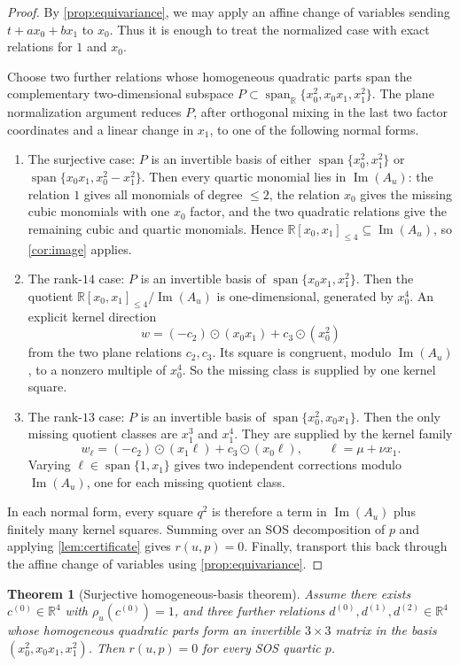 \documentclass[10pt]{article}
\newtheorem{theorem}{Theorem}[section]
\theoremstyle{definition}
\newcommand{\R}{\mathbb{R}}
\newcommand{\Poly}{\R[x_0,x_1]}
\newcommand{\Quart}{\Poly_{\le 4}}
\newcommand{\HomQ}{\operatorname{span}_{\R}\{x_0^2,x_0x_1,x_1^2\}}
\DeclareMathOperator{\mspan}{span}
\DeclareMathOperator{\imag}{Im}
\newcommand{\Span}{\mspan}
\newcommand{\im}{\imag}
\newcommand{\rel}{\rho}
\begin{document}
\begin{proof}
By \cref{prop:equivariance}, we may apply an affine change of variables sending
\(t+a x_0+b x_1\) to \(x_0\). Thus it is enough to treat the normalized case
with exact relations for \(1\) and \(x_0\).

Choose two further relations whose homogeneous quadratic parts span the
complementary two-dimensional subspace \(P\subset \HomQ\). The plane
normalization argument reduces \(P\), after orthogonal mixing in the last two
factor coordinates and a linear change in \(x_1\), to one of the following
normal forms.
\begin{enumerate}
\item The surjective case: \(P\) is an invertible basis of either
\(\Span\{x_0^2,x_1^2\}\) or \(\Span\{x_0x_1,x_0^2-x_1^2\}\). Then every quartic
monomial lies in \(\im(A_u)\): the relation \(1\) gives all monomials of degree
\(\le 2\), the relation \(x_0\) gives the missing cubic monomials with one
\(x_0\) factor, and the two quadratic relations give the remaining cubic and
quartic monomials. Hence \(\Quart\subseteq \im(A_u)\), so \cref{cor:image}
applies.
\item The rank-\(14\) case: \(P\) is an invertible basis of
\(\Span\{x_0x_1,x_1^2\}\). Then the quotient \(\Quart/\im(A_u)\) is
one-dimensional, generated by \(x_0^4\). An explicit kernel direction
\[
  w=(-c_2)\odot (x_0x_1)+c_3\odot (x_0^2)
\]
from the two plane relations \(c_2,c_3\). Its square is congruent, modulo
\(\im(A_u)\), to a nonzero multiple of \(x_0^4\). So the missing class is
supplied by one kernel square.
\item The rank-\(13\) case: \(P\) is an invertible basis of
\(\Span\{x_0^2,x_0x_1\}\). Then the only missing quotient classes are
\(x_1^3\) and \(x_1^4\). They are supplied by the kernel family
\[
  w_\ell=(-c_2)\odot (x_1\ell)+c_3\odot (x_0\ell),
  \qquad \ell=\mu+\nu x_1 .
\]
Varying \(\ell\in \Span\{1,x_1\}\) gives two independent corrections modulo
\(\im(A_u)\), one for each missing quotient class.
\end{enumerate}
In each normal form, every square \(q^2\) is therefore a term in \(\im(A_u)\)
plus finitely many kernel squares. Summing over an SOS decomposition of \(p\)
and applying \cref{lem:certificate} gives \(r(u,p)=0\). Finally, transport this
back through the affine change of variables using \cref{prop:equivariance}.
\end{proof}

\begin{theorem}[Surjective homogeneous-basis theorem]
\label{thm:surjective-basis}
Assume there exists \(c^{(0)}\in \R^4\) with \(\rel_u(c^{(0)})=1\), and three
further relations \(d^{(0)},d^{(1)},d^{(2)}\in \R^4\) whose homogeneous
quadratic parts form an invertible \(3\times 3\) matrix in the basis
\((x_0^2,x_0x_1,x_1^2)\). Then \(r(u,p)=0\) for every SOS quartic \(p\).
\end{theorem}
\end{document}
